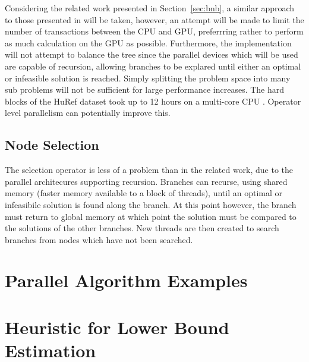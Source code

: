 \documentclass[10pt,twocolumn]{witseiepaper}
\begin{document}
Considering the related work presented in Section~\ref{sec:bnb}, a similar approach to those presented in
\cite{melab:2012, chakroun:2012, chakroun:2013} will be taken, however, an attempt will be made to limit the
number of transactions between the CPU and GPU, preferrring rather to perform as much calculation on the GPU
as possible. Furthermore, the implementation will not attempt to balance the tree since the parallel devices
which will be used are capable of recursion, allowing branches to be explared until either an optimal or
infeasible solution is reached. Simply splitting the problem space into many sub problems will not be
sufficient for large performance increases. The hard blocks of the HuRef dataset took up to 12 hours on a
multi-core CPU \cite{chen:2013}. Operator level parallelism can potentially improve this.

\subsection{Node Selection}

The selection operator is less of a problem than in the related work, due to the parallel architecures
supporting recursion. Branches can recurse, using shared memory (faster memory available to a block of
threads), until an optimal or infeasibile solution is found along the branch. At this point however, the 
branch must return to global memory at which point the solution must be compared to the solutions of the other
branches. New threads are then created to search branches from nodes which have not been searched.




\appendix

\clearpage 

\section{Parallel Algorithm Examples }

\section{Heuristic for Lower Bound Estimation}
\end{document}
